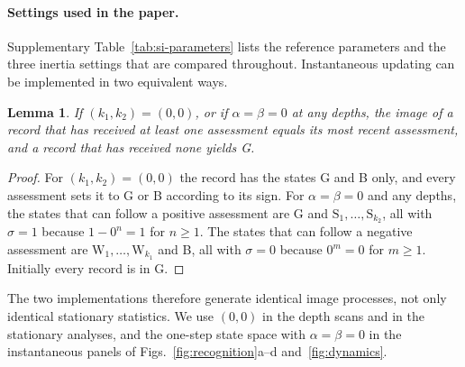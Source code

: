 \documentclass[fleqn,10pt]{wlscirep}
\newcommand{\st}[1]{\mathrm{#1}}           %
\theoremstyle{plain}
\newtheorem{lemma}{Lemma}
\begin{document}
\paragraph{Settings used in the paper.} Supplementary Table~\ref{tab:si-parameters} lists the reference parameters and the three inertia settings that are compared throughout. Instantaneous updating can be implemented in two equivalent ways.

\begin{lemma}\label{lem:instantaneous}
If $(k_1,k_2)=(0,0)$, or if $\alpha=\beta=0$ at any depths, the image of a record that has received at least one assessment equals its most recent assessment, and a record that has received none yields G.
\end{lemma}
\begin{proof}
For $(k_1,k_2)=(0,0)$ the record has the states G and B only, and every assessment sets it to G or B according to its sign. For $\alpha=\beta=0$ and any depths, the states that can follow a positive assessment are G and $\st S_1,\ldots,\st S_{k_2}$, all with $\sigma=1$ because $1-0^n=1$ for $n\geq1$. The states that can follow a negative assessment are $\st W_1,\ldots,\st W_{k_1}$ and B, all with $\sigma=0$ because $0^m=0$ for $m\geq1$. Initially every record is in G.
\end{proof}

The two implementations therefore generate identical image processes, not only identical stationary statistics. We use $(0,0)$ in the depth scans and in the stationary analyses, and the one-step state space with $\alpha=\beta=0$ in the instantaneous panels of Figs.~\ref{fig:recognition}a--d and~\ref{fig:dynamics}.
\end{document}

